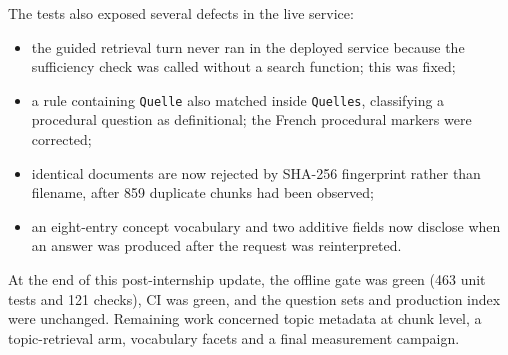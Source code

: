 \documentclass[a4paper,12pt,openany]{report}
\begin{document}
The tests also exposed several defects in the live service:
\begin{itemize}
  \item the guided retrieval turn never ran in the deployed service because the sufficiency check
was called without a search function; this was fixed;
  \item a rule containing \texttt{Quelle} also matched inside \texttt{Quelles}, classifying a
procedural question as definitional; the French procedural markers were corrected;
  \item identical documents are now rejected by SHA-256 fingerprint rather than filename, after
859 duplicate chunks had been observed;
  \item an eight-entry concept vocabulary and two additive fields now disclose when an answer was
produced after the request was reinterpreted.
\end{itemize}

At the end of this post-internship update, the offline gate was green (463 unit tests and
121 checks), CI was green, and the question sets and production index were unchanged. Remaining
work concerned topic metadata at chunk level, a topic-retrieval arm, vocabulary facets and a final
measurement campaign.

\appendix
\end{document}
